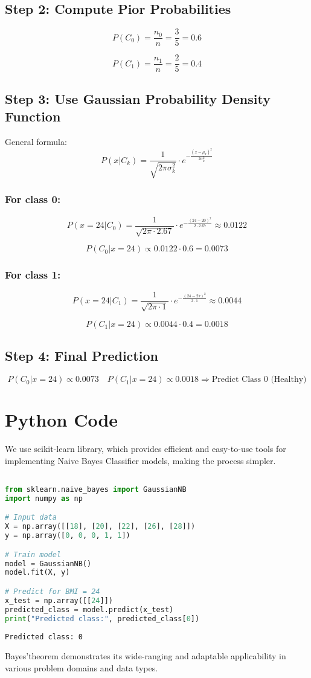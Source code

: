 \documentclass{article}
\begin{document}
\subsection*{Step 2: Compute Pior Probabilities}

$$
P(C_0) = \frac{n_0}{n} = \frac{3}{5} = 0.6
$$

$$
P(C_1) = \frac{n_1}{n} = \frac{2}{5} = 0.4
$$

\subsection*{Step 3: Use Gaussian Probability Density Function}

General formula:
$$
P(x|C_k) = \frac{1}{\sqrt{2\pi \sigma_k^2}} \cdot e^{-\frac{(x - \mu_k)^2}{2\sigma_k^2}}
$$

\subsubsection*{For class 0:}

$$
P(x=24|C_0) = \frac{1}{\sqrt{2\pi \cdot 2.67}} \cdot e^{-\frac{(24 - 20)^2}{2 \cdot 2.67}} \approx 0.0122
$$

$$
P(C_0|x=24) \propto 0.0122 \cdot 0.6 = 0.0073
$$


\subsubsection*{For class 1:}
$$
P(x=24|C_1) = \frac{1}{\sqrt{2\pi \cdot 1}} \cdot e^{-\frac{(24 - 27)^2}{2 \cdot 1}} \approx 0.0044
$$

$$
P(C_1|x=24) \propto 0.0044 \cdot 0.4 = 0.0018
$$

\subsection*{Step 4: Final Prediction}

$$
P(C_0|x=24) \propto 0.0073 \quad
P(C_1|x=24) \propto 0.0018
\Rightarrow \text{Predict Class 0 (Healthy)}
$$

\section*{Python Code}
We use scikit-learn library, which provides efficient and easy-to-use tools for implementing Naive Bayes Classifier models, making the process simpler.
\begin{lstlisting}[language=Python, caption={NBC For Continuous Random Variable}]

from sklearn.naive_bayes import GaussianNB
import numpy as np

# Input data
X = np.array([[18], [20], [22], [26], [28]])
y = np.array([0, 0, 0, 1, 1])

# Train model
model = GaussianNB()
model.fit(X, y)

# Predict for BMI = 24
x_test = np.array([[24]])
predicted_class = model.predict(x_test)
print("Predicted class:", predicted_class[0])

\end{lstlisting}

\begin{lstlisting}
Predicted class: 0 
\end{lstlisting}


Bayes'theorem demonstrates its wide-ranging and adaptable applicability in various problem domains and data types.
\end{document}
